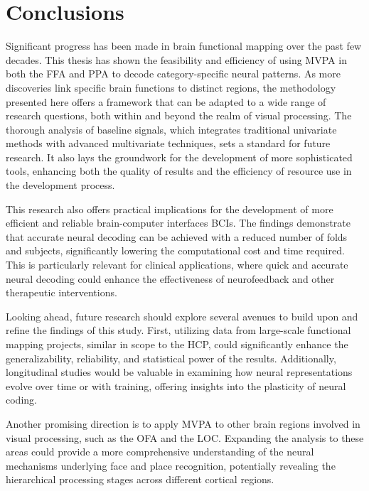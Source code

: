 \pagebreak
\chapter{Conclusions}
\label{sec:conclusions}

Significant progress has been made in brain functional mapping over the past few decades. This thesis has shown the feasibility and efficiency of using \gls{MVPA} in both the \gls{FFA} and \gls{PPA} to decode category-specific neural patterns. As more discoveries link specific brain functions to distinct regions, the methodology presented here offers a framework that can be adapted to a wide range of research questions, both within and beyond the realm of visual processing. The thorough analysis of baseline signals, which integrates traditional univariate methods with advanced multivariate techniques, sets a standard for future research. It also lays the groundwork for the development of more sophisticated tools, enhancing both the quality of results and the efficiency of resource use in the development process.

This research also offers practical implications for the development of more efficient and reliable brain-computer interfaces \gls{BCI}s. The findings demonstrate that accurate neural decoding can be achieved with a reduced number of folds and subjects, significantly lowering the computational cost and time required. This is particularly relevant for clinical applications, where quick and accurate neural decoding could enhance the effectiveness of neurofeedback and other therapeutic interventions.

Looking ahead, future research should explore several avenues to build upon and refine the findings of this study. First, utilizing data from large-scale functional mapping projects, similar in scope to the \gls{HCP}, could significantly enhance the generalizability, reliability, and statistical power of the results. Additionally, longitudinal studies would be valuable in examining how neural representations evolve over time or with training, offering insights into the plasticity of neural coding. 

Another promising direction is to apply \gls{MVPA} to other brain regions involved in visual processing, such as the \gls{OFA} and the \gls{LOC}. Expanding the analysis to these areas could provide a more comprehensive understanding of the neural mechanisms underlying face and place recognition, potentially revealing the hierarchical processing stages across different cortical regions.

